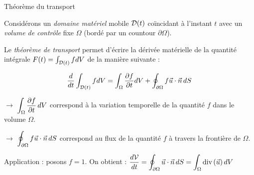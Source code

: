 \begin{frame}{Théorème du transport}

\small

Considérons un {\em domaine matériel } mobile ${\cal D} (t)$ coïncidant à l'instant $t$ avec un {\em volume de contrôle } fixe $\Omega$ (bordé par un countour $\partial \Omega$).

Le {\em théorème de transport} permet d'écrire la dérivée matérielle de la quantité intégrale $F(t) =  \int_{{\cal D}(t)} f d V$ de la manière suivante :

$$
\frac{d}{dt} \int_{{\cal D}(t)} f d V  = \int_\Omega \frac{\partial f } {\partial t} dV + \oint_{\partial\Omega} f\vec{u}\cdot\vec{n}\, dS
$$


\bigskip
\pause

%

$\longrightarrow$ $ \displaystyle \int_\Omega \displaystyle \frac{\partial f}{\partial t}\, dV$ correspond à la variation temporelle de la quantité $f$
dans le volume $\Omega$.

\smallskip

$\longrightarrow$ $\displaystyle \oint_{\partial\Omega} f\vec{u}\cdot\vec{n}\, dS$ correspond au \textcolor{rouge}{flux}
de la quantité $f$ à travers la frontière de $\Omega$.

\pause
\bigskip




\pause 

Application : posons $f=1$. On obtient :
\smallskip
$	
\displaystyle \frac{d \mathcal{V}}{dt} = \oint_{\partial\Omega} \vec{u}\cdot\vec{n}\, dS = 
\int_\Omega  \mbox{\rm div}\, (\vec{u})  \, dV
$


\end{frame}
